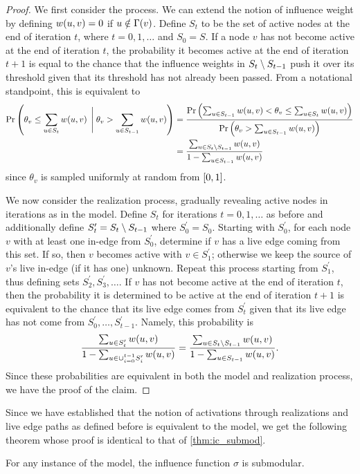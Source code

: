 \begin{proof}
    We first consider the \ltmodel{} process. We can extend the notion of influence weight by defining 
    $\f[w]{u, v} = 0$ if $u \notin \f[\Gamma]{v}$. Define $S_t$ to be the set of active nodes at the end of iteration $t$, where $t = 0, 1, \ldots$ and $S_0 = S$. 
    If a node $v$ has not become active at the end of iteration $t$, the probability it becomes active at the end of iteration $t+1$
    is equal to the chance that the influence weights in $S_t \sm S_{t-1}$ push it over its threshold given that its threshold has not already been passed. 
    From a notational standpoint, this is equivalent to 
    \begin{align*}
        \Pr \lrp{\theta_v \leq \sum_{u \in S_t} \f[w]{u,v} \; \Biggl\lvert \; \theta_v > \sum_{u \in S_{t-1}} \f[w]{u,v}} &= 
        \frac{\Pr \lrp{\sum_{u \in S_{t-1}} \f[w]{u,v} < \theta_v \leq \sum_{u \in S_t} \f[w]{u,v}}}{\Pr \lrp{\theta_v > \sum_{u \in S_{t-1}} \f[w]{u,v}}}\\
        &=  \frac{\sum_{u \in S_t \sm S_{t-1}} \f[w]{u, v}}{1 - \sum_{u \in S_{t-1}} \f[w]{u, v}}
    \end{align*}
    since $\theta_v$ is sampled uniformly at random from $\lrb{0, 1}$.  

    We now consider the realization process, gradually revealing active nodes in iterations as in the \ltmodel{} model. Define $S_t$ for iterations $t = 0, 1, \ldots$ as before and additionally 
    define $S_t^\prime = S_t \sm S_{t-1}$ where $S_0^\prime = S_0$. Starting with $S_0^\prime$, for each node $v$ with at least one in-edge from 
    $S_0^\prime$, determine if $v$ has a live edge coming from this set. If so, then $v$ becomes active with $v \in S_1^\prime$; otherwise we keep the source 
    of $v$'s live in-edge (if it has one) unknown. Repeat this process starting from $S_1^\prime$, thus defining sets $S_2^\prime, S_3^\prime, \ldots$. 
    If $v$ has not become active at the end of iteration $t$, then the probability it is determined to be active at the end of iteration $t+1$ is equivalent 
    to the chance that its live edge comes from $S_t^\prime$ given that its live edge has not come from $S_0^\prime, \ldots, S_{t-1}^\prime$. 
    Namely, this probability is 
    \begin{equation*}
        \frac{\sum_{u \in S_t^\prime} \f[w]{u, v}}{1 - \sum_{u \in \cup_{i=0}^{t-1} S_i^\prime} \f[w]{u, v}} = \frac{\sum_{u \in S_t \sm S_{t-1}} \f[w]{u, v}}{1 - \sum_{u \in S_{t-1}} \f[w]{u, v}}. 
    \end{equation*}
    Since these probabilities are equivalent in both the \ltmodel{} model and realization process, we have the proof of the claim. 
\end{proof}

Since we have established that the notion of activations through realizations and live edge paths as defined before 
is equivalent to the \ltmodel{} model, we get the following theorem whose proof is identical to that of \cref{thm:ic_submod}. 
\begin{theorem}
    For any instance of the \ltmodel{} model, the influence function $\sigma$ is submodular. 
    \label{thm:lt_submod}
\end{theorem}
